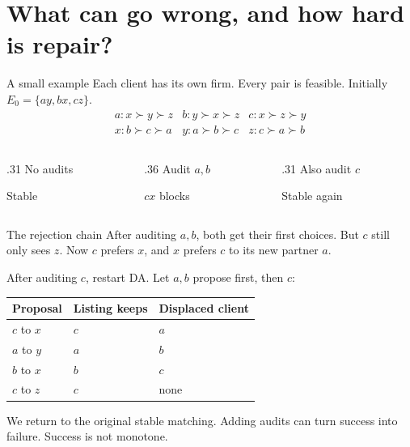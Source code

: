 \section{What can go wrong, and how hard is repair?}
\begin{frame}[t,label=example]{A small example}
\small
Each client has its own firm. Every pair is feasible.
Initially $E_0=\{ay,bx,cz\}$.
\[
\begin{array}{lll}
 a:x\succ y\succ z & b:y\succ x\succ z & c:x\succ z\succ y\\
 x:b\succ c\succ a & y:a\succ b\succ c & z:c\succ a\succ b
\end{array}
\]
\vspace{-2mm}
\begin{columns}[T,onlytextwidth]
\begin{column}{.31\textwidth}\centering
No audits\par{}\par Stable
\end{column}
\begin{column}{.36\textwidth}\centering
Audit $a,b$\par{}\par {\color{rust}$cx$ blocks}
\end{column}
\begin{column}{.31\textwidth}\centering
Also audit $c$\par{}\par Stable again
\end{column}
\end{columns}
\end{frame}

\begin{frame}[t,label=chain]{The rejection chain}
\small
After auditing $a,b$, both get their first choices. But $c$ still only sees $z$.
Now $c$ prefers $x$, and $x$ prefers $c$ to its new partner $a$.

\medskip
After auditing $c$, restart DA. Let $a,b$ propose first, then $c$:
\begin{center}
\begin{tabular}{@{}lll@{}}
\toprule
Proposal & Listing keeps & Displaced client\\
\midrule
$c$ to $x$ & $c$ & $a$\\
$a$ to $y$ & $a$ & $b$\\
$b$ to $x$ & $b$ & $c$\\
$c$ to $z$ & $c$ & none\\
\bottomrule
\end{tabular}
\end{center}
We return to the original stable matching.
Adding audits can turn success into failure. Success is not monotone.
\end{frame}

